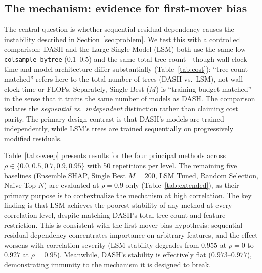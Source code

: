 \documentclass[11pt]{article}
\newcommand{\dash}{\textsc{DASH}}
\newcommand{\rhovar}{\rho}
\begin{document}
\subsection{The mechanism: evidence for first-mover bias}
\label{sec:mechanism_result}

The central question is whether sequential residual dependency causes
the instability described in Section~\ref{sec:problem}. We test this
with a controlled comparison: \dash{} and the Large Single Model (LSM)
both use the same low \texttt{colsample\_bytree} (0.1--0.5) and the same
total tree count---though wall-clock time and model architecture differ
substantially (Table~\ref{tab:cost}): ``tree-count-matched'' refers here to
the total number of trees (DASH vs.\ LSM), not wall-clock time or FLOPs.
Separately, Single Best ($M$) is ``training-budget-matched'' in the sense
that it trains the same number of models as DASH. The comparison isolates the
\emph{sequential vs.\ independent} distinction rather than claiming
cost parity. The primary design contrast is that \dash{}'s models
are trained independently, while LSM's trees are trained sequentially
on progressively modified residuals.

Table~\ref{tab:sweep} presents results for the four principal methods
across $\rhovar \in \{0.0, 0.5, 0.7, 0.9, 0.95\}$ with 50 repetitions per
level. The remaining five baselines (Ensemble SHAP, Single Best $M{=}200$,
LSM Tuned, Random Selection, Naive Top-$N$) are evaluated at
$\rhovar = 0.9$ only (Table~\ref{tab:extended}), as their primary
purpose is to contextualize the mechanism at high correlation. The key finding is that LSM achieves the poorest
stability of any method at every correlation level, despite matching
\dash{}'s total tree count and feature restriction. This is consistent
with the first-mover bias hypothesis: sequential residual dependency concentrates
importance on arbitrary features, and the effect worsens with
correlation severity (LSM stability degrades from $0.955$ at
$\rhovar = 0$ to $0.927$ at $\rhovar = 0.95$). Meanwhile, \dash{}'s
stability is effectively flat ($0.973$--$0.977$), demonstrating
immunity to the mechanism it is designed to break.
\end{document}
